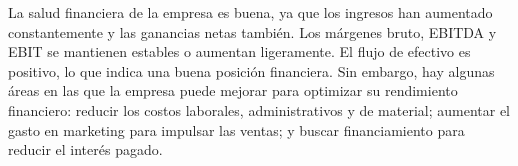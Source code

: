 
                La salud financiera de la empresa es buena, ya que los ingresos han aumentado constantemente y las ganancias netas también. Los márgenes bruto, EBITDA y EBIT se mantienen estables o aumentan ligeramente. El flujo de efectivo es positivo, lo que indica una buena posición financiera. Sin embargo, hay algunas áreas en las que la empresa puede mejorar para optimizar su rendimiento financiero: reducir los costos laborales, administrativos y de material; aumentar el gasto en marketing para impulsar las ventas; y buscar financiamiento para reducir el interés pagado.
